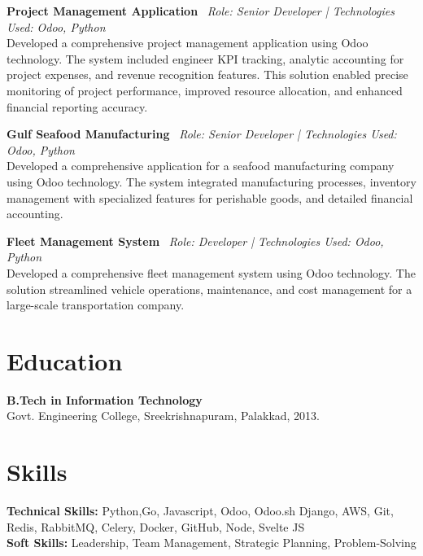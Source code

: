 \documentclass[a4paper,10pt]{article}
\begin{document}
\vspace{3mm}

\textbf{Project Management Application} \
\textit{Role: Senior Developer | Technologies Used: Odoo, Python} \\
Developed a comprehensive project management application using Odoo technology. The system included engineer KPI tracking, analytic accounting for project expenses, and revenue recognition features. This solution enabled precise monitoring of project performance, improved resource allocation, and enhanced financial reporting accuracy. 

\vspace{3mm}

\textbf{Gulf Seafood Manufacturing} \
\textit{Role: Senior Developer | Technologies Used: Odoo, Python} \\
Developed a comprehensive application for a seafood manufacturing company using Odoo technology. The system integrated manufacturing processes, inventory management with specialized features for perishable goods, and detailed financial accounting.

\vspace{3mm}

\textbf{Fleet Management System} \
\textit{Role: Developer | Technologies Used: Odoo, Python} \\
Developed a comprehensive fleet management system using Odoo technology. The solution streamlined vehicle operations, maintenance, and cost management for a large-scale transportation company. 

\vspace{5mm}

\section*{\textcolor{primary}{Education}}
\textbf{B.Tech in Information Technology} \\
Govt. Engineering College, Sreekrishnapuram, Palakkad, 2013.

\vspace{5mm}

\section*{\textcolor{primary}{Skills}}
\textbf{Technical Skills:} Python,Go, Javascript, Odoo, Odoo.sh Django, AWS, Git, Redis, RabbitMQ, Celery, Docker, GitHub, Node, Svelte JS \\
\textbf{Soft Skills:} Leadership, Team Management, Strategic Planning, Problem-Solving
\end{document}
